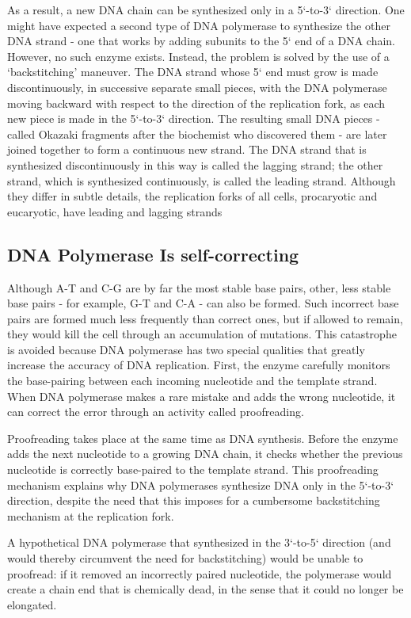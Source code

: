 As a result, a new DNA chain can be synthesized only
in a 5`-to-3` direction. One
might have expected a second type of DNA polymerase to synthesize the
other DNA strand - one that works by adding subunits to the 5` end of
a DNA chain. However, no such enzyme exists. Instead, the problem is
solved by the use of a ‘backstitching’ maneuver. The DNA strand whose
5` end must grow is made discontinuously, in successive separate small
pieces, with the DNA polymerase moving backward with respect to the
direction of the replication fork, as each new piece is made in the 5`-to-3`
direction.
The resulting small DNA pieces - called Okazaki fragments after the
biochemist who discovered them - are later joined together to form a
continuous new strand. The DNA strand that is synthesized
discontinuously in this way is called the lagging strand; the other strand,
which is synthesized continuously, is called the leading strand.
Although they differ in subtle details, the replication forks of all cells,
procaryotic and eucaryotic, have leading and lagging strands

\subsection{DNA Polymerase Is self-correcting}

Although A-T and C-G are by far the most stable base pairs, other, less
stable base pairs - for example, G-T and C-A - can also be formed. Such
incorrect base pairs are formed much less frequently than correct ones,
but if allowed to remain, they would kill the cell through an accumulation
of mutations. This catastrophe is avoided because DNA polymerase
has two special qualities that greatly increase the accuracy of DNA replication.
First, the enzyme carefully monitors the base-pairing between
each incoming nucleotide and the template strand.
When DNA polymerase makes a rare mistake and adds
the wrong nucleotide, it can correct the error through an activity called
proofreading.

Proofreading takes place at the same time as DNA synthesis. Before
the enzyme adds the next nucleotide to a growing DNA chain, it checks
whether the previous nucleotide is correctly base-paired to the template
strand. This proofreading mechanism explains why DNA polymerases synthesize
DNA only in the 5`-to-3` direction, despite the need that this imposes for a
cumbersome backstitching mechanism at the replication fork.

A hypothetical DNA polymerase that synthesized in the
3`-to-5` direction (and would thereby circumvent the need for backstitching)
would be unable to proofread: if it removed an incorrectly paired
nucleotide, the polymerase would create a chain end that is chemically
dead, in the sense that it could no longer be elongated.

